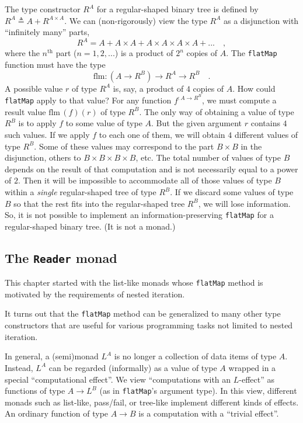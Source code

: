 The type constructor $R^{A}$ for a regular-shaped binary tree is
defined by $R^{A}\triangleq A+R^{A\times A}$. We can (non-rigorously)
view the type $R^{A}$ as a disjunction with \textsf{``}infinitely many\textsf{''}
parts,
\[
R^{A}=A+A\times A+A\times A\times A\times A+...\quad,
\]
where the $n^{\text{th}}$ part ($n=1,2,...$) is a product of $2^{n}$
copies of $A$. The \lstinline!flatMap! function must have the type
\[
\text{flm}:(A\rightarrow R^{B})\rightarrow R^{A}\rightarrow R^{B}\quad.
\]
A possible value $r$ of type $R^{A}$ is, say, a product of $4$
copies of $A$. How could \lstinline!flatMap! apply to that value?
For any function $f^{:A\rightarrow R^{B}}$, we must compute a result
value $\text{flm}\,(f)(r)$ of type $R^{B}$. The only way of obtaining
a value of type $R^{B}$ is to apply $f$ to some value of type $A$.
But the given argument $r$ contains $4$ such values. If we apply
$f$ to each one of them, we will obtain $4$ different values of
type $R^{B}$. Some of these values may correspond to the part $B\times B$
in the disjunction, others to $B\times B\times B\times B$, etc. The
total number of values of type $B$ depends on the result of that
computation and is not necessarily equal to a power of $2$. Then
it will be impossible to accommodate all of those values of type $B$
within a \emph{single} regular-shaped tree of type $R^{B}$. If we
discard some values of type $B$ so that the rest fits into the regular-shaped
tree $R^{B}$, we will lose information. So, it is not possible to
implement an information-preserving \lstinline!flatMap! for a regular-shaped
binary tree. (It is not a monad.)

\subsection{The \texttt{Reader} monad\label{subsec:The-Reader-monad}}

This chapter started
with the list-like monads whose \lstinline!flatMap! method is motivated
by the requirements of nested iteration. %
\begin{comment}
We then looked at tree-like monads, which generalize nested list iterations
to tree grafting. 
\end{comment}
It turns out that the \lstinline!flatMap! method can be generalized
to many other type constructors that are useful for various programming
tasks not limited to nested iteration.

In general, a (semi)monad $L^{A}$ is no longer a collection of data
items of type $A$. Instead, $L^{A}$ can be regarded (informally)
as a value of type $A$ wrapped in a special \textsf{``}computational effect\textsf{''}.
We view \textsf{``}computations with an $L$-effect\textsf{''} as functions of type
$A\rightarrow L^{B}$ (as in \lstinline!flatMap!\textsf{'}s argument type).
In this view, different monads \textemdash{} such as list-like, pass/fail,
or tree-like \textemdash{} implement different kinds of effects. An
ordinary function of type $A\rightarrow B$ is a computation with
a \textsf{``}trivial effect\textsf{''}.

